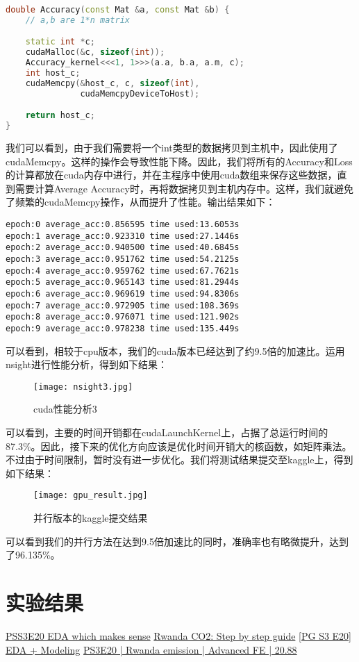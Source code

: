 \documentclass{ctexart}
\begin{document}
\begin{sloppypar}
\begin{lstlisting}[language=C++]
double Accuracy(const Mat &a, const Mat &b) {
    // a,b are 1*n matrix

    static int *c;
    cudaMalloc(&c, sizeof(int));
    Accuracy_kernel<<<1, 1>>>(a.a, b.a, a.m, c);
    int host_c;
    cudaMemcpy(&host_c, c, sizeof(int),
               cudaMemcpyDeviceToHost);

    return host_c;
}
\end{lstlisting}
我们可以看到，由于我们需要将一个int类型的数据拷贝到主机中，因此使用了cudaMemcpy。这样的操作会导致性能下降。因此，我们将所有的Accuracy和Loss的计算都放在cuda内存中进行，并在主程序中使用cuda数组来保存这些数据，直到需要计算Average Accuracy时，再将数据拷贝到主机内存中。这样，我们就避免了频繁的cudaMemcpy操作，从而提升了性能。输出结果如下：
\begin{lstlisting}
epoch:0 average_acc:0.856595 time used:13.6053s
epoch:1 average_acc:0.923310 time used:27.1446s
epoch:2 average_acc:0.940500 time used:40.6845s
epoch:3 average_acc:0.951762 time used:54.2125s
epoch:4 average_acc:0.959762 time used:67.7621s
epoch:5 average_acc:0.965143 time used:81.2944s
epoch:6 average_acc:0.969619 time used:94.8306s
epoch:7 average_acc:0.972905 time used:108.369s
epoch:8 average_acc:0.976071 time used:121.902s
epoch:9 average_acc:0.978238 time used:135.449s
\end{lstlisting}
可以看到，相较于cpu版本，我们的cuda版本已经达到了约9.5倍的加速比。运用nsight进行性能分析，得到如下结果：
\begin{figure}[H]
    \centering
    \texttt{[image: nsight3.jpg]}
    \caption{cuda性能分析3}
\end{figure}
可以看到，主要的时间开销都在cudaLaunchKernel上，占据了总运行时间的87.3\%。因此，接下来的优化方向应该是优化时间开销大的核函数，如矩阵乘法。不过由于时间限制，暂时没有进一步优化。我们将测试结果提交至kaggle上，得到如下结果：
\begin{figure}[H]
    \centering
    \texttt{[image: gpu\_result.jpg]}
    \caption{并行版本的kaggle提交结果}
\end{figure}
可以看到我们的并行方法在达到9.5倍加速比的同时，准确率也有略微提升，达到了96.135\%。
\section{实验结果}



\begin{thebibliography}{100}
      \href{https://www.kaggle.com/code/ambrosm/pss3e20-eda-which-makes-sense}{PSS3E20 EDA which makes sense}
      \href{https://www.kaggle.com/code/kacperrabczewski/rwanda-co2-step-by-step-guide}{Rwanda CO2: Step by step guide}
      \href{https://www.kaggle.com/code/yaaangzhou/pg-s3-e20-eda-modeling}{[PG S3 E20] EDA + Modeling}
      \href{https://www.kaggle.com/code/dmitryuarov/ps3e20-rwanda-emission-advanced-fe-20-88}{PS3E20 | Rwanda emission | Advanced FE | 20.88}
\end{thebibliography}

\end{sloppypar}
\end{document}
